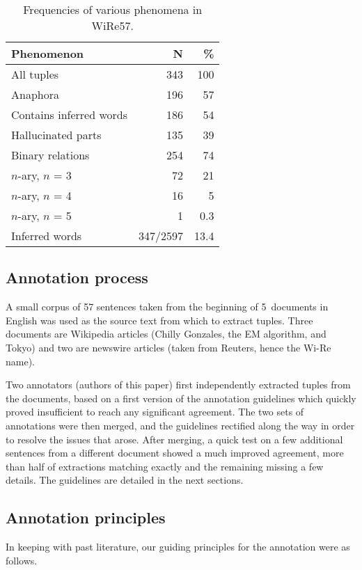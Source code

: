 \pdfoutput=1 \documentclass[11pt, a4paper]{article}
\begin{document}
\begin{table}[htb]
\centering
\begin{tabular}{lrr}
Phenomenon & N & \%\\
\hline
All tuples & 343 & 100\\
Anaphora & 196 & 57\\
Contains inferred words & 186 & 54\\
Hallucinated parts & 135 & 39\\
Binary relations & 254 & 74\\
$n$-ary, \(n\) = 3 & 72 & 21\\
$n$-ary, \(n\) = 4 & 16 & 5\\
$n$-ary, \(n\) = 5 & 1 & 0.3\\
\hline
Inferred words & 347/2597 & 13.4\\
\end{tabular}
\caption{\label{tab:org109a930}
Frequencies of various phenomena in WiRe57.}
\end{table}

\subsection{Annotation process}
\label{sec:org85568e7}
A small corpus of 57 sentences taken from the beginning of 5~documents in
English was used as the source text from which to extract tuples. Three
documents are Wikipedia articles (Chilly Gonzales, the EM algorithm, and Tokyo)
and two are newswire articles (taken from Reuters, hence the Wi-Re name).

Two annotators (authors of this paper) first independently extracted tuples
from the documents, based on a first version of the annotation guidelines
which quickly proved insufficient to reach any significant agreement. The
two sets of annotations were then merged, and the guidelines rectified
along the way in order to resolve the issues that arose. After merging, a quick test on a few additional sentences from a different document showed a much improved agreement, more than half of extractions matching exactly and the remaining missing a few details. The guidelines are detailed in the next sections.

\subsection{Annotation principles}
\label{sec:org1c2d80b}
In keeping with past literature, our guiding principles for the annotation
were as follows.
\end{document}
